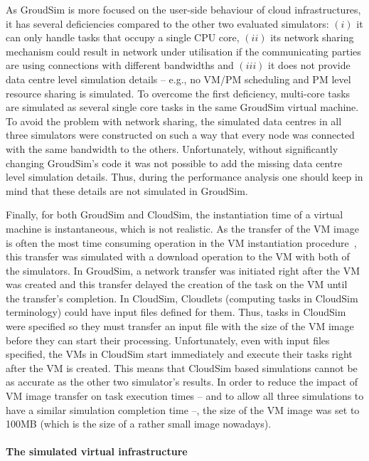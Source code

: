 \documentclass[sort, compress, 5p]{elsarticle}
\begin{document}
As GroudSim is more focused on the user-side behaviour of cloud infrastructures, it has several deficiencies compared to the other two evaluated simulators: $(i)$ it can only handle tasks that occupy a single CPU core, $(ii)$ its network sharing mechanism could result in network under utilisation if the communicating parties are using connections with different bandwidths and $(iii)$  it does not provide data centre level simulation details -- e.g., no VM/PM scheduling and PM level resource sharing is simulated. To overcome the first deficiency, multi-core tasks are simulated as several single core tasks in the same GroudSim virtual machine. To avoid the problem with network sharing, the simulated data centres in all three simulators were constructed on such a way that every node was connected with the same bandwidth to the others. Unfortunately, without significantly changing GroudSim's code it was not possible to add the missing data centre level simulation details. Thus, during the performance analysis one should keep in mind that these details are not simulated in GroudSim.

Finally, for both GroudSim and CloudSim, the instantiation time of a virtual machine is instantaneous, which is not realistic. As the transfer of the VM image is often the most time consuming operation in the VM instantiation procedure~\cite{DISS}, this transfer was simulated with a download operation to the VM with both of the simulators. In GroudSim, a network transfer was initiated right after the VM was created and this transfer delayed the creation of the task on the VM until the transfer's  completion. In CloudSim, Cloudlets (computing tasks in CloudSim terminology) could have input files defined for them. Thus, tasks in CloudSim were specified so they must transfer an input file with the size of the VM image before they can start their processing. Unfortunately, even with input files specified, the VMs in CloudSim start immediately and execute their tasks right after the VM is created. This means that CloudSim based simulations cannot be as accurate as the other two simulator's results. In order to reduce the impact of VM image transfer on task execution times -- and to allow all three simulations to have a similar simulation completion time --, the size of the VM image was set to 100MB (which is the size of a rather small image nowadays).

\paragraph{The simulated virtual infrastructure}
\end{document}
